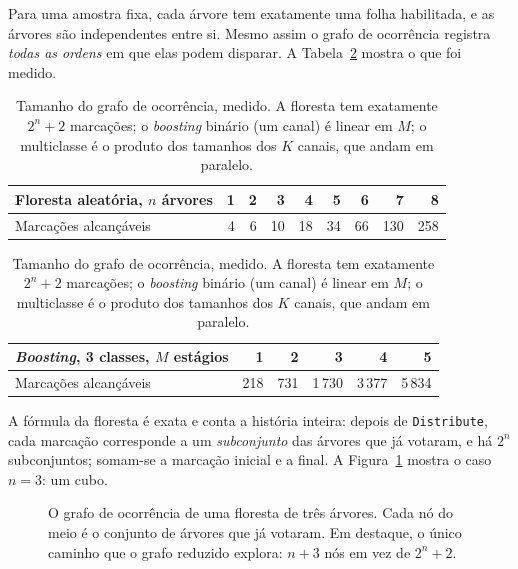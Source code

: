 \documentclass[11pt,a4paper]{report}
\newcommand{\code}[1]{\texttt{\small #1}}
\theoremstyle{definition}
\begin{document}
Para uma amostra fixa, cada árvore tem exatamente uma folha habilitada, e as
árvores são independentes entre si. Mesmo assim o grafo de ocorrência registra
\emph{todas as ordens} em que elas podem disparar. A Tabela~\ref{tab:medido}
mostra o que foi medido.

\begin{table}[ht]
\centering\small
\begin{tabular}{lrrrrrrrr}
\toprule
Floresta aleatória, $n$ árvores & 1 & 2 & 3 & 4 & 5 & 6 & 7 & 8 \\
\midrule
Marcações alcançáveis & 4 & 6 & 10 & 18 & 34 & 66 & 130 & 258 \\
\bottomrule
\end{tabular}

\vspace{8pt}
\begin{tabular}{lrrrrr}
\toprule
\emph{Boosting}, 3 classes, $M$ estágios & 1 & 2 & 3 & 4 & 5 \\
\midrule
Marcações alcançáveis & 218 & 731 & 1\,730 & 3\,377 & 5\,834 \\
\bottomrule
\end{tabular}
\caption{Tamanho do grafo de ocorrência, medido. A floresta tem exatamente
$2^n+2$ marcações; o \emph{boosting} binário (um canal) é linear em $M$; o
multiclasse é o produto dos tamanhos dos $K$ canais, que andam em paralelo.}
\label{tab:medido}
\end{table}

A fórmula da floresta é exata e conta a história inteira: depois de
\code{Distribute}, cada marcação corresponde a um \emph{subconjunto} das
árvores que já votaram, e há $2^n$ subconjuntos; somam-se a marcação inicial
e a final. A Figura~\ref{fig:cubo} mostra o caso $n=3$: um cubo.

\begin{figure}[ht]
\centering
{}
\caption{O grafo de ocorrência de uma floresta de três árvores. Cada nó do
meio é o conjunto de árvores que já votaram. Em destaque, o único caminho que
o grafo reduzido explora: $n+3$ nós em vez de $2^n+2$.}
\label{fig:cubo}
\end{figure}
\end{document}
